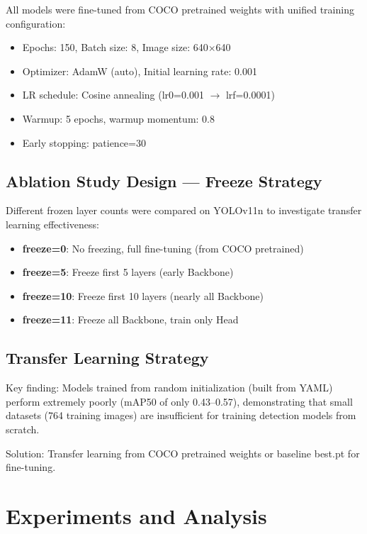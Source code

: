 \documentclass[12pt,a4paper]{article}
\begin{document}
All models were fine-tuned from COCO pretrained weights with unified training configuration:
\begin{itemize}[noitemsep]
  \item Epochs: 150, Batch size: 8, Image size: 640$\times$640
  \item Optimizer: AdamW (auto), Initial learning rate: 0.001
  \item LR schedule: Cosine annealing (lr0=0.001 $\to$ lrf=0.0001)
  \item Warmup: 5 epochs, warmup momentum: 0.8
  \item Early stopping: patience=30
\end{itemize}

\subsection{Ablation Study Design --- Freeze Strategy}

Different frozen layer counts were compared on YOLOv11n to investigate transfer learning effectiveness:
\begin{itemize}[noitemsep]
  \item \textbf{freeze=0}: No freezing, full fine-tuning (from COCO pretrained)
  \item \textbf{freeze=5}: Freeze first 5 layers (early Backbone)
  \item \textbf{freeze=10}: Freeze first 10 layers (nearly all Backbone)
  \item \textbf{freeze=11}: Freeze all Backbone, train only Head
\end{itemize}

\subsection{Transfer Learning Strategy}

Key finding: Models trained from random initialization (built from YAML) perform extremely poorly (mAP50 of only 0.43--0.57), demonstrating that small datasets (764 training images) are insufficient for training detection models from scratch.

Solution: Transfer learning from COCO pretrained weights or baseline best.pt for fine-tuning.

\section{Experiments and Analysis}
\end{document}
